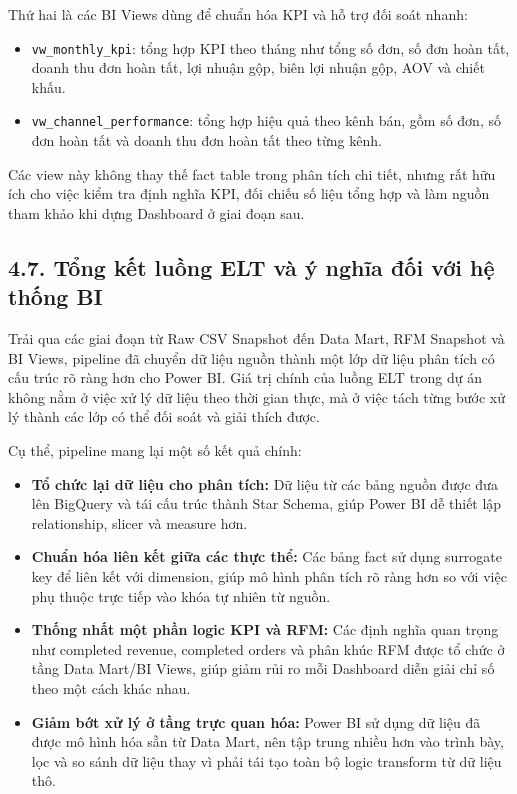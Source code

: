 \documentclass[12pt,a4paper]{article}
\newcommand{\code}[1]{\texttt{#1}}
\begin{document}
Thứ hai là các BI Views dùng để chuẩn hóa KPI và hỗ trợ đối soát nhanh:

\begin{itemize}
    \item \code{vw\_monthly\_kpi}: tổng hợp KPI theo tháng như tổng số đơn, số đơn hoàn tất, doanh thu đơn hoàn tất, lợi nhuận gộp, biên lợi nhuận gộp, AOV và chiết khấu.
    \item \code{vw\_channel\_performance}: tổng hợp hiệu quả theo kênh bán, gồm số đơn, số đơn hoàn tất và doanh thu đơn hoàn tất theo từng kênh.
\end{itemize}

Các view này không thay thế fact table trong phân tích chi tiết, nhưng rất hữu ích cho việc kiểm tra định nghĩa KPI, đối chiếu số liệu tổng hợp và làm nguồn tham khảo khi dựng Dashboard ở giai đoạn sau.

\subsection{4.7. Tổng kết luồng ELT và ý nghĩa đối với hệ thống BI}

Trải qua các giai đoạn từ Raw CSV Snapshot đến Data Mart, RFM Snapshot và BI Views, pipeline đã chuyển dữ liệu nguồn thành một lớp dữ liệu phân tích có cấu trúc rõ ràng hơn cho Power BI. Giá trị chính của luồng ELT trong dự án không nằm ở việc xử lý dữ liệu theo thời gian thực, mà ở việc tách từng bước xử lý thành các lớp có thể đối soát và giải thích được.

Cụ thể, pipeline mang lại một số kết quả chính:

\begin{itemize}
    \item \textbf{Tổ chức lại dữ liệu cho phân tích:} Dữ liệu từ các bảng nguồn được đưa lên BigQuery và tái cấu trúc thành Star Schema, giúp Power BI dễ thiết lập relationship, slicer và measure hơn.
    \item \textbf{Chuẩn hóa liên kết giữa các thực thể:} Các bảng fact sử dụng surrogate key để liên kết với dimension, giúp mô hình phân tích rõ ràng hơn so với việc phụ thuộc trực tiếp vào khóa tự nhiên từ nguồn.
    \item \textbf{Thống nhất một phần logic KPI và RFM:} Các định nghĩa quan trọng như completed revenue, completed orders và phân khúc RFM được tổ chức ở tầng Data Mart/BI Views, giúp giảm rủi ro mỗi Dashboard diễn giải chỉ số theo một cách khác nhau.
    \item \textbf{Giảm bớt xử lý ở tầng trực quan hóa:} Power BI sử dụng dữ liệu đã được mô hình hóa sẵn từ Data Mart, nên tập trung nhiều hơn vào trình bày, lọc và so sánh dữ liệu thay vì phải tái tạo toàn bộ logic transform từ dữ liệu thô.
\end{itemize}
\end{document}
